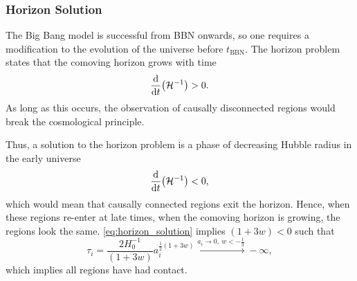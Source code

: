 \subsubsection{Horizon Solution}

The Big Bang model is successful from BBN onwards, so one requires a modification to the evolution of the universe before \(t_{\text{BBN}}\).
The horizon problem states that the comoving horizon grows with time
%
\begin{equation}
	\dv{t} \big(\mathcal{H}^{-1}\big)
	> 0.
\end{equation}
%
As long as this occurs, the observation of causally disconnected regions would break the cosmological principle.

Thus, a solution to the horizon problem is a phase of decreasing Hubble radius in the early universe
%
\begin{equation}\label{eq:horizon_solution}
	\dv{t} \big(\mathcal{H}^{-1}\big)
	< 0,
\end{equation}
%
which would mean that causally connected regions exit the horizon.
Hence, when these regions re-enter at late times, when the comoving horizon is growing, the regions look the same.
\cref{eq:horizon_solution} implies \((1+3w) < 0\) such that
%
\begin{equation}
	\tau_{i}
	= \frac{2H_{0}^{-1}}{(1+3w)} a_{i}^{\frac{1}{2}(1+3w)}
	\xrightarrow{a_{i} \rightarrow 0,\ w < -\frac{1}{3}} -\infty,
\end{equation}
%
which implies all regions have had contact.

